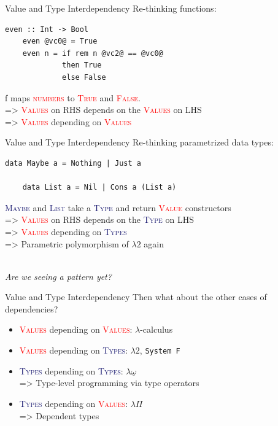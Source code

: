 \documentclass[xcolor={usenames,dvipsnames}]{beamer}
\newcommand{\htycon}[1]{\textcolor{MidnightBlue}{\textsc{#1}}}
\newcommand{\hvalcon}[1]{\textcolor{Red}{\textsc{#1}}}
\begin{document}
\begin{frame}[fragile]{Value and Type Interdependency}
  Re-thinking functions:
  \begin{lstlisting}[style=hask]
    even :: Int -> Bool
    even @vc0@ = True
    even n = if rem n @vc2@ == @vc0@
             then True
             else False
  \end{lstlisting}

  \qquad f maps \hvalcon{numbers} to \hvalcon{True} and \hvalcon{False}.
  \ \\
  \pause
  => \hvalcon{Values} on RHS depends on the \hvalcon{Values} on LHS
  \ \\
  \pause
  => \hvalcon{Values} depending on \hvalcon{Values}
\end{frame}

\begin{frame}[fragile]{Value and Type Interdependency}
  Re-thinking parametrized data types:
  \begin{lstlisting}[style=hask]
    data Maybe a = Nothing | Just a

    data List a = Nil | Cons a (List a)
  \end{lstlisting}

  \pause
  \qquad \htycon{Maybe} and \htycon{List} take a \htycon{Type} and return \hvalcon{Value} constructors
  \ \\
  \pause
  => \hvalcon{Values} on RHS depends on the \htycon{Type} on LHS
  \ \\
  \pause
  => \hvalcon{Values} depending on \htycon{Types}
  \ \\
  \pause
  => Parametric polymorphism of $\lambda2$ again

  \ \\
  \pause
  \textit{\tiny{Are we seeing a pattern yet?}}
\end{frame}

\begin{frame}[fragile]{Value and Type Interdependency}
  Then what about the other cases of dependencies?
  \pause
  \begin{itemize}
    \item \hvalcon{Values} depending on \hvalcon{Values}: $\lambda$-calculus
    \pause
    \item \hvalcon{Values} depending on \htycon{Types}: $\lambda2$, \texttt{System F}
    \pause
    \item \htycon{Types} depending on \htycon{Types}: \pause$\lambda\underline\omega$\\
      => Type-level programming via type operators
    \pause
    \item \htycon{Types} depending on \hvalcon{Values}: \pause$\lambda\Pi$\\
      => Dependent types
  \end{itemize}
\end{frame}
\end{document}
